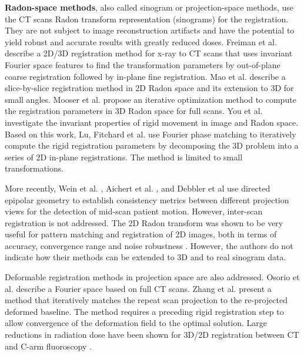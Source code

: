 \textbf{Radon-space methods}, also called sinogram or projection-space methods, use the CT scans Radon transform representation (sinograms) for the registration. They are not subject to image reconstruction artifacts and have the potential to yield robust and accurate results with greatly reduced doses.
Freiman et al. \cite{freiman2011spectral} describe a 2D/3D registration method for x-ray to CT scans that uses invariant Fourier space features to find the transformation parameters by out-of-plane coarse registration followed by in-plane fine registration. 
Mao et al. \cite{mao2007ct} describe a slice-by-slice registration method in 2D Radon space and its extension to 3D for small angles.
Mooser et al. \cite{mooser2013estimation} propose an iterative optimization method to compute the registration parameters in 3D Radon space for full scans. 
You et al. \cite{you1998image} investigate the invariant properties of rigid movement in image and Radon space. 
Based on this work, Lu, Fitchard et al. \cite{lu1999image, fitchard1998registration, fitchard1999six} use Fourier phase matching to iteratively compute the rigid registration parameters by decomposing the 3D problem into a series of 2D in-plane registrations. The method is limited to small transformations. 

More recently, Wein et al. \cite{wein2011detecting}, Aichert et al. \cite{aichert2014redundancies,aichert2015epipolar}, and Debbler et al \cite{debbeler2013new} use directed epipolar geometry to establish consistency metrics between different projection views for the detection of mid-scan patient motion. However, inter-scan registration is not addressed. 
The 2D Radon transform was shown to be very useful for pattern matching and registration of 2D images, both in terms of accuracy, convergence range and noise robustness \cite{nacereddine2015similarity, wan2010fast}. However, the authors do not indicate how their methods can be extended to 3D and to real sinogram data. 

Deformable registration methods in projection space are also addressed. 
Osorio et al. \cite{osorio2007non} describe a Fourier space based on full CT scans.
Zhang et al. \cite{zhang2014few} present a method that iteratively matches the repeat scan projection to the re-projected deformed baseline. The method requires a preceding rigid registration step to allow convergence of the deformation field to the optimal solution.  
Large reductions in radiation dose have been shown for 3D/2D registration between CT and C-arm fluoroscopy \cite{uneri2014evaluation}.

